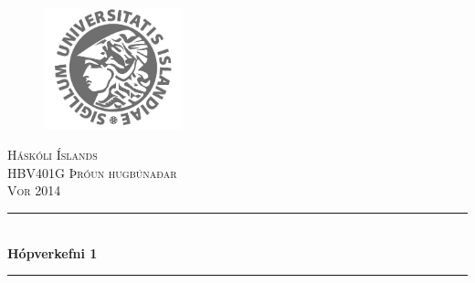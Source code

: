 \begin{titlepage}

\newcommand{\HRule}{\rule{\linewidth}{0.5mm}} %

\center %
 
\begin{figure}[h!]
\centering
\includegraphics[width=40mm]{hi.png}
\end{figure}

\textsc{\LARGE Háskóli Íslands}\\[1.5cm] %
\textsc{\Large HBV401G Þróun hugbúnaðar}\\[0.5cm] %
\textsc{\large Vor 2014}\\[0.5cm] %


\HRule \\[0.4cm]
{ \huge \bfseries Hópverkefni 1}\\[0.4cm] %
\HRule \\[1.5cm]
 


\end{titlepage}
